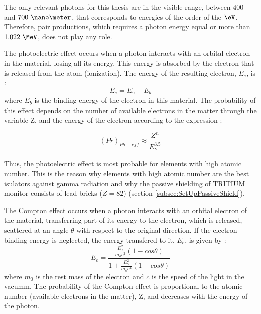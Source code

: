 The only relevant photons for this thesis are in the visible range, between $400$ and $700~\nano\meter$, that corresponds to energies of the order of the $\eV$. Therefore, pair productions, which requires a photon energy equal or more than $1.022~\MeV$, does not play any role.

The photoelectric effect occurs when a photon interacts with an orbital electron in the material, losing all its energy. This energy is absorbed by the electron that is released from the atom (ionization). The energy of the resulting electron, $E_e$, is \cite{Knoll, Leo}:
\begin{equation}
E_e = E_\gamma - E_b 
\label{eq:PhotoelectricEffect}
\end{equation}
where $E_b$ is the binding energy of the electron in this material. The probability of this effect depends on the number of available electrons in the matter through the variable Z, and the energy of the electron according to the expression \cite{Knoll}:

\begin{equation}
\left(Pr\right)_{Ph-eff} \approx \frac{Z^n}{E_\gamma^{3.5}}
\label{eq:PhotoelectricProb}
\end{equation}

Thus, the photoelectric effect is most probable for elements with high atomic number. This is the reason why elements with high atomic number are the best isulators against gamma radiation and why the passive shielding of TRITIUM monitor consists of lead bricks ($Z=82$) (section \ref{subsec:SetUpPassiveShield}). %

The Compton effect occurs when a photon interacts with an orbital electron of the material, transferring part of its energy to the electron, which is released, scattered at an angle $\theta$ with respect to the original direction. If the electron binding energy is neglected, the energy transfered to it, $E_e$, is given by \cite{Knoll, Leo}:
\begin{equation}
E_e=\frac{\frac{E_\gamma^2}{m_oc^2}\left(1-cos\theta\right)}{1+ \frac{E_\gamma^2}{m_oc^2}\left(1-cos\theta\right)}
\label{eq:ComptonEffect}
\end{equation}
where $m_0$ is the rest mass of the electron and $c$ is the speed of the light in the vacumm. The probability of the Compton effect is proportional to the atomic number (available electrons in the matter), Z,  and decreases with the energy of the photon. 

